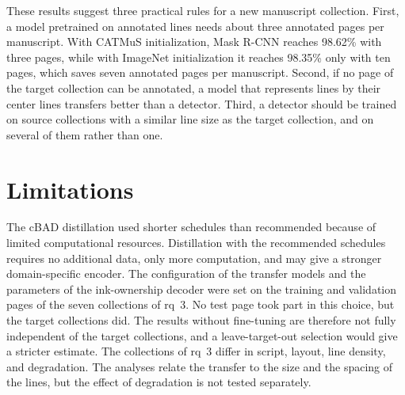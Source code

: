 These results suggest three practical rules for a new manuscript collection. First, a model pretrained on annotated lines needs about three annotated pages per manuscript. With CATMuS initialization, Mask R-CNN reaches 98.62\% with three pages, while with ImageNet initialization it reaches 98.35\% only with ten pages, which saves seven annotated pages per manuscript. Second, if no page of the target collection can be annotated, a model that represents lines by their center lines transfers better than a detector. Third, a detector should be trained on source collections with a similar line size as the target collection, and on several of them rather than one.

\section{Limitations}
\label{sec:disc-limitations}

The cBAD distillation used shorter schedules than recommended because of limited computational resources. Distillation with the recommended schedules requires no additional data, only more computation, and may give a stronger domain-specific encoder. The configuration of the transfer models and the parameters of the ink-ownership decoder were set on the training and validation pages of the seven collections of \gls{rq}~3. No test page took part in this choice, but the target collections did. The results without fine-tuning are therefore not fully independent of the target collections, and a leave-target-out selection would give a stricter estimate. The collections of \gls{rq}~3 differ in script, layout, line density, and degradation. The analyses relate the transfer to the size and the spacing of the lines, but the effect of degradation is not tested separately.
